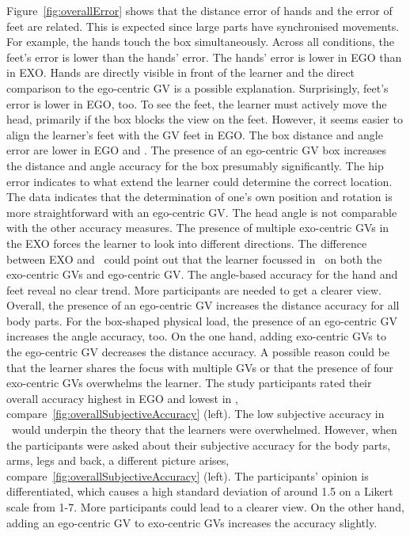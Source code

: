 Figure~\ref{fig:overallError} shows that the distance error of hands and the error of feet are related. This is expected since large parts have synchronised movements. For example, the hands touch the box simultaneously. Across all conditions, the feet's error is lower than the hands' error. The hands' error is lower in EGO than in EXO. Hands are directly visible in front of the learner and the direct comparison to the ego-centric GV is a possible explanation. Surprisingly, feet's error is lower in EGO, too. To see the feet, the learner must actively move the head, primarily if the box blocks the view on the feet. However, it seems easier to align the learner's feet with the GV feet in EGO. The box distance and angle error are lower in EGO and \combi. The presence of an ego-centric GV box increases the distance and angle accuracy for the box presumably significantly. The hip error indicates to what extend the learner could determine the correct location. The data indicates that the determination of one's own position and rotation is more straightforward with an ego-centric GV. The head angle is not comparable with the other accuracy measures. The presence of multiple exo-centric GVs in the EXO forces the learner to look into different directions. The difference between EXO and \combi\ could point out that the learner focussed in \combi\ on both the exo-centric GVs and ego-centric GV. The angle-based accuracy for the hand and feet reveal no clear trend. More participants are needed to get a clearer view. Overall, the presence of an ego-centric GV increases the distance accuracy for all body parts. For the box-shaped physical load, the presence of an ego-centric GV increases the angle accuracy, too. On the one hand, adding exo-centric GVs to the ego-centric GV decreases the distance accuracy. A possible reason could be that the learner shares the focus with multiple GVs or that the presence of four exo-centric GVs overwhelms the learner. The study participants rated their overall accuracy highest in EGO and lowest in \combi, compare~\ref{fig:overallSubjectiveAccuracy} (left). The low subjective accuracy in \combi\ would underpin the theory that the learners were overwhelmed. However, when the participants were asked about their subjective accuracy for the body parts, arms, legs and back, a different picture arises, compare~\ref{fig:overallSubjectiveAccuracy} (left). The participants' opinion is differentiated, which causes a high standard deviation of around 1.5 on a Likert scale from 1-7. More participants could lead to a clearer view. On the other hand, adding an ego-centric GV to exo-centric GVs increases the accuracy slightly.\\
